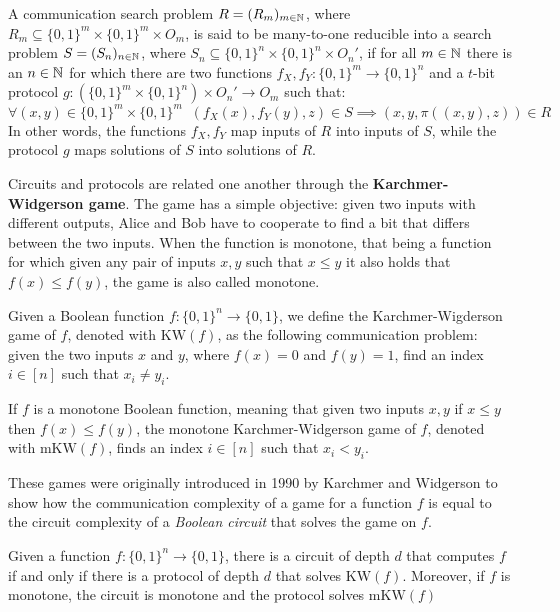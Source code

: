 \newpage

\begin{definition}
    A communication search problem $R = (R_m)_{m \in \mathbb{N}}$, where $R_m \subseteq \{0,1\}^m \times \{0,1\}^m \times O_m$, is said to be many-to-one reducible into a search problem $S = (S_n)_{n \in \mathbb{N}}$, where $S_n \subseteq \{0,1\}^n \times \{0,1\}^n \times O_n'$, if for all $m \in \mathbb{N}$ there is an $n \in \mathbb{N}$ for which there are two functions $f_X, f_Y : \{0,1\}^m \to \{0,1\}^n$ and a $t$-bit protocol $g : (\{0,1\}^m \times \{0,1\}^n) \times O_n' \to O_m$ such that:
       \[\forall (x,y) \in \{0,1\}^m \times \{0,1\}^m \;\; (f_X(x), f_Y(y), z) \in S \implies (x, y, \pi((x,y), z)) \in R\]
    In other words, the functions $f_X,f_Y$ map inputs of $R$ into inputs of $S$, while the protocol $g$ maps solutions of $S$ into solutions of $R$. 
\end{definition}

Circuits and protocols are related one another through the \textbf{Karchmer-Widgerson game}. The game has a simple objective: given two inputs with different outputs, Alice and Bob have to cooperate to find a bit that differs between the two inputs. When the function is monotone, that being a function for which given any pair of inputs $x,y$ such that $x \leq y$ it also holds that $f(x) \leq f(y)$, the game is also called monotone. 

\begin{definition}
    Given a Boolean function $f : \{0, 1\}^n \to \{0, 1\}$, we define the Karchmer-Wigderson game of $f$, denoted with $\mathrm{KW}(f)$, as the following communication problem: given the two inputs $x$ and $y$, where $f(x) = 0$ and $f(y) = 1$, find an index $i \in [n]$ such that $x_i \neq y_i$.

    If $f$ is a monotone Boolean function, meaning that given two inputs $x,y$ if $x \leq y$ then $f(x) \leq f(y)$, the monotone Karchmer-Widgerson game of $f$, denoted with $\mathrm{mKW}(f)$, finds an index $i \in [n]$ such that $x_i < y_i$.
\end{definition}

These games were originally introduced in 1990 by Karchmer and Widgerson \cite{kw_games} to show how the communication complexity of a game for a function $f$ is equal to the circuit complexity of a \textit{Boolean circuit} that solves the game on $f$.

\begin{theorem}
    Given a function $f : \{0, 1\}^n \to \{0, 1\}$, there is a circuit of depth $d$ that computes $f$ if and only if there is a protocol of depth $d$ that solves $\mathrm{KW}(f)$. Moreover, if $f$ is monotone, the circuit is monotone and the protocol solves $\mathrm{mKW}(f)$
\end{theorem}

